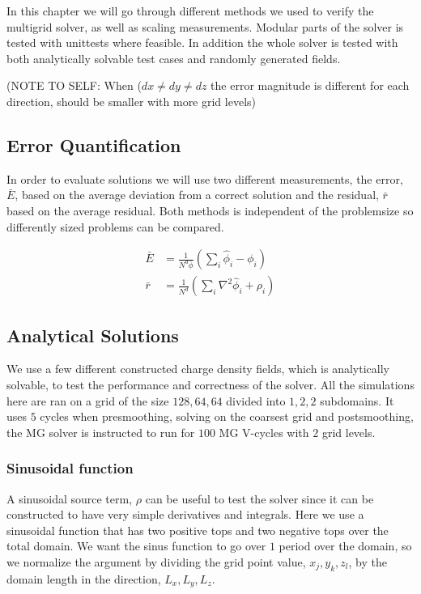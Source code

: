 In this chapter we will go through different methods we used to verify the multigrid
solver, as well as scaling measurements. Modular parts of the solver is tested with unittests
where feasible. In addition the whole solver is tested with both analytically solvable
test cases and randomly generated fields.

(NOTE TO SELF: When (\(dx\neq dy\neq dz\) the error magnitude is different for each direction,
should be smaller with more grid levels)

\subsection{Error Quantification}
	In order to evaluate solutions we will use two different measurements, the error, \(\bar{E}\), based
	on the average deviation from a correct solution and the residual, \(\bar{r}\) based on the average
	residual. Both methods is independent of the problemsize so differently sized problems can be compared.

	\begin{align}
		\bar{E} &= \frac{1}{N^d\bar{\phi}}\left( \sum_i{\hat{\phi}_i - \phi_i} \right)
		\\
		\bar{r} &= \frac{1}{N^d}\left( \sum_i{ \nabla^2 \hat{\phi}_i + \rho_i  }  \right)
	\end{align}

	\subsection{Analytical Solutions}
		We use a few different constructed charge density fields, which is analytically solvable,
		to test the performance and correctness of the solver. All the simulations here are ran on
		a grid of the size \( 128, 64, 64 \) divided into \(1,2,2\) subdomains.
 		It uses \(5\) cycles when presmoothing, solving on the coarsest grid and postsmoothing, the
		MG solver is instructed to run for \(100\) MG V-cycles with \(2\) grid levels.

	\subsubsection{Sinusoidal function}
		\label{sec:sinusoidal}
		A sinusoidal source term, \(\rho\) can be useful to test the solver since
		it can be constructed to have very simple derivatives and integrals. Here
		we use a sinusoidal function that has two positive tops and two negative tops
		over the total domain. We want the sinus function to go over \(1\) period
		over the domain, so we normalize the argument by dividing the grid point
		value, \(x_j, y_k, z_l\), by the domain length in the direction, \(L_x, L_y, L_z\).

